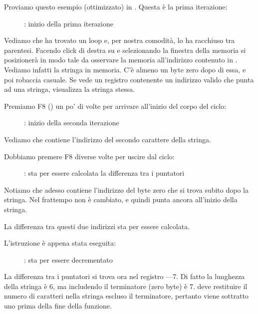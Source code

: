 \clearpage
{}
\myindex{\olly}

Proviamo questo esempio (ottimizzato) in \olly. Questa è la prima iterazione:

\begin{figure}[H]
\centering
{}
\caption{\olly: inizio della prima iterazione}
\label{fig:strlen_olly_1}
\end{figure}

Vediamo che \olly ha trovato un loop e, per nostra comodità, lo ha racchiuso tra parentesi.
Facendo click di destra su \EAX e selezionando  la finestra della memoria si posizionerà in modo tale da osservare la memoria all'indirizzo contenuto in \EAX.
Vediamo infatti la stringa  in memoria. C'è almeno un byte zero dopo di essa, e poi robaccia casuale.
Se \olly vede un registro contenente un indirizzo valido che punta ad una stringa, visualizza la stringa stessa.

\clearpage
Premiamo F8 (\stepover) un po' di volte per arrivare all'inizio del corpo del ciclo:

\begin{figure}[H]
\centering
{}
\caption{\olly: inizio della seconda iterazione}
\label{fig:strlen_olly_2}
\end{figure}

Vediamo che \EAX contiene l'indirizzo del secondo carattere della stringa.

\clearpage


Dobbiamo premere F8 diverse volte per uscire dal ciclo:

\begin{figure}[H]
\centering
{}
\caption{\olly: sta per essere calcolata la differenza tra i puntatori}
\label{fig:strlen_olly_3}
\end{figure}

Notiamo che \EAX adesso contiene l'indirizzo del byte zero che si trova subito dopo la stringa.
Nel frattempo \EDX non è cambiato, e quindi punta ancora all'inizio della stringa.

La differenza tra questi due indirizzi sta per essere calcolata.

\clearpage
L'istruzione \SUB è appena stata eseguita:

\begin{figure}[H]
\centering
{}
\caption{\olly: \EAX sta per essere decrementato}
\label{fig:strlen_olly_4}
\end{figure}

La differenza tra i puntatori si trova ora nel registro \EAX---7.
Di fatto la lunghezza della stringa  è 6, ma includendo il terminatore (zero byte) è 7.
 deve restituire il numero di caratteri nella stringa escluso il terminatore, pertanto viene sottratto uno prima della fine
della funzione.
